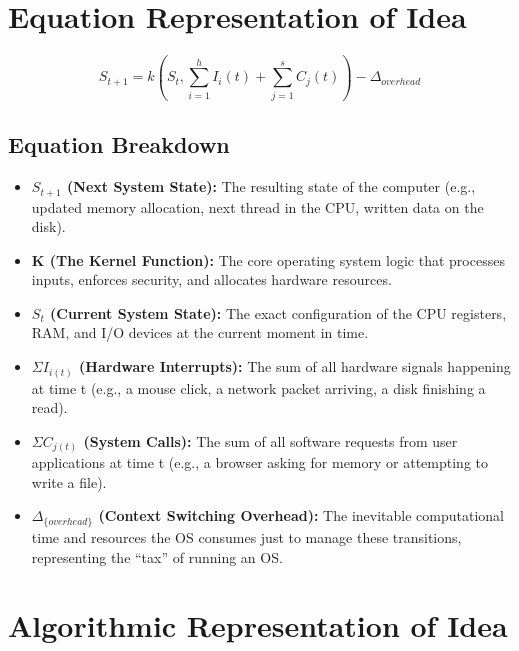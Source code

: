 \documentclass[11pt, a4paper]{article}
\begin{document}
\section*{Equation Representation of Idea}
\begin{equation}
    S_{t+1} = k \left( S_t, \sum_{i=1}^{h} I_i(t) + \sum_{j=1}^{s} C_j(t) \right) - \Delta_{overhead}
    \label{eq:os_state}
\end{equation}

\subsection*{Equation Breakdown}
\begin{itemize}
    \item \textbf{$S_{t+1}$ (Next System State):} The resulting state of the computer (e.g., updated memory allocation, next thread in the CPU, written data on the disk).
    \item \textbf{K (The Kernel Function):} The core operating system logic that processes inputs, enforces security, and allocates hardware resources.
    \item \textbf{$S_t$ (Current System State):} The exact configuration of the CPU registers, RAM, and I/O devices at the current moment in time.
    \item \textbf{$\Sigma I_{i(t)}$ (Hardware Interrupts):} The sum of all hardware signals happening at time t (e.g., a mouse click, a network packet arriving, a disk finishing a read).
    \item \textbf{$\Sigma C_{j(t)}$ (System Calls):} The sum of all software requests from user applications at time t (e.g., a browser asking for memory or attempting to write a file).
    \item \textbf{$\Delta_{\{overhead\}}$ (Context Switching Overhead):} The inevitable computational time and resources the OS consumes just to manage these transitions, representing the ``tax'' of running an OS.
\end{itemize}

\section*{Algorithmic Representation of Idea}
\end{document}
